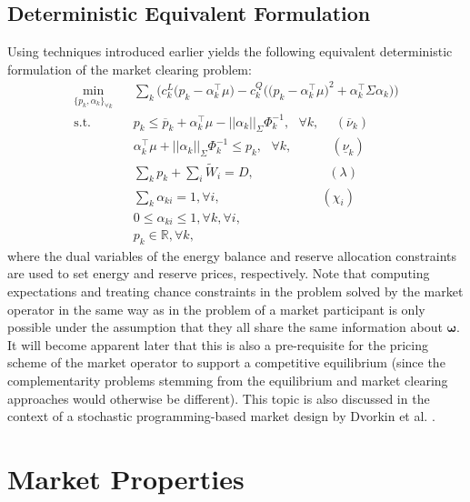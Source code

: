 \documentclass{article}
\begin{document}
\subsection{Deterministic Equivalent Formulation}
Using techniques introduced earlier yields the following equivalent deterministic formulation of the market clearing problem:
\begin{align}
\underset{\{p_k, \alpha_k\}_{\forall k}}{\min} \hspace{10pt} & \sum_k \Big(c_k^L\big(p_k - \alpha_k^\top \mu\big) - c_k^Q \Big(\big(p_k - \alpha_{k}^\top \mu \big)^2 + \alpha_k^\top \Sigma \alpha_k\Big)\Big)\\
\mbox{s.t. } & p_k \le \overline{p}_k + \alpha_k^\top \mu - ||\alpha_k||_{\Sigma} \Phi_k^{-1}, \mbox{ }\forall k, \hspace{15pt}(\overline{\nu}_k)\\
& \alpha_k^\top \mu + ||\alpha_k||_{\Sigma} \Phi_k^{-1} \le p_k, \mbox{ }\forall k, \hspace{37pt}(\underline{\nu}_k)\\
& \sum_k p_k + \sum_i \tilde{W}_i = D, \hspace{70pt} (\lambda)\\
& \sum_k \alpha_{ki} = 1, \forall i, \hspace{95pt} (\chi_i)\\
& 0 \le \alpha_{ki} \le 1, \forall k, \forall i,\\
& p_k \in \mathbb{R}, \forall k,
\end{align}
where the dual variables of the energy balance and reserve allocation constraints are used to set energy and reserve prices, respectively. Note that computing expectations and treating chance constraints in the problem solved by the market operator in the same way as in the problem of a market participant is only possible under the assumption that they all share the same information about $\boldsymbol{\omega}$. It will become apparent later that this is also a pre-requisite for the pricing scheme of the market operator to support a competitive equilibrium (since the complementarity problems stemming from the equilibrium and market clearing approaches would otherwise be different). This topic is also discussed in the context of a stochastic programming-based market design by Dvorkin et al. \cite{DvorkinV2019}.

\section{Market Properties}
\end{document}
